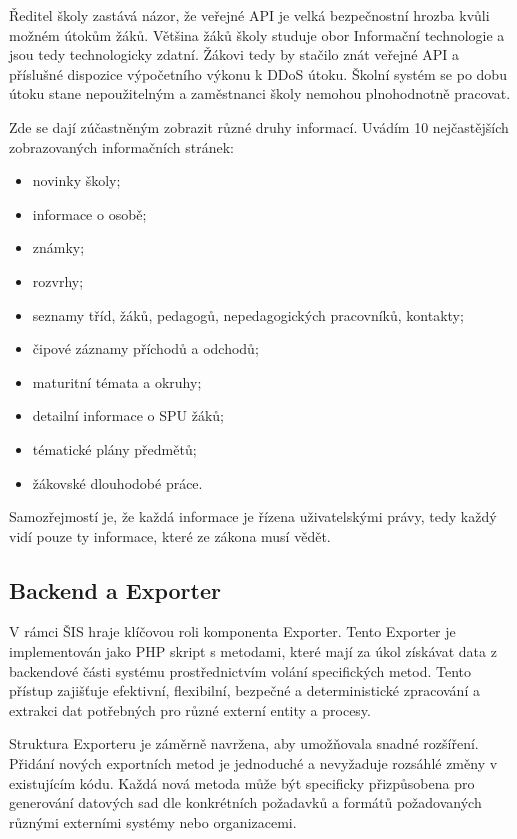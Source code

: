 \documentclass[FM,Proj]{tulthesis}
\begin{document}
Ředitel školy zastává názor, že veřejné API je velká bezpečnostní hrozba kvůli možném útokům
žáků. Většina žáků školy studuje obor Informační technologie a jsou tedy technologicky zdatní.
Žákovi tedy by stačilo znát veřejné API a příslušné dispozice výpočetního výkonu k DDoS útoku.
Školní systém se po dobu útoku stane nepoužitelným a zaměstnanci školy nemohou plnohodnotně
pracovat.

Zde se dají zúčastněným zobrazit různé druhy informací. Uvádím 10 nejčastějších zobrazovaných
informačních stránek:
\begin{itemize}
    \item novinky školy;
    \item informace o osobě;
    \item známky;
    \item rozvrhy;
    \item seznamy tříd, žáků, pedagogů, nepedagogických pracovníků, kontakty;
    \item čipové záznamy příchodů a odchodů;
    \item maturitní témata a okruhy;
    \item detailní informace o SPU žáků;
    \item tématické plány předmětů;
    \item žákovské dlouhodobé práce.
\end{itemize}
Samozřejmostí je, že každá informace je řízena uživatelskými právy, tedy každý vidí pouze ty
informace, které ze zákona musí vědět.

\subsection{Backend a Exporter}
\label{section:backend-a-exporter}
V rámci ŠIS hraje klíčovou roli komponenta Exporter. Tento Exporter je implementován
jako PHP skript s metodami, které mají za úkol získávat data z backendové části 
systému prostřednictvím volání specifických metod. Tento přístup zajišťuje efektivní,
flexibilní, bezpečné a deterministické zpracování a extrakci dat potřebných pro různé
externí entity a procesy.

Struktura Exporteru je záměrně navržena, aby umožňovala snadné rozšíření. Přidání
nových exportních metod je jednoduché a nevyžaduje rozsáhlé změny v existujícím kódu.
Každá nová metoda může být specificky přizpůsobena pro generování datových sad
dle konkrétních požadavků a formátů požadovaných různými externími systémy nebo
organizacemi.
\end{document}

